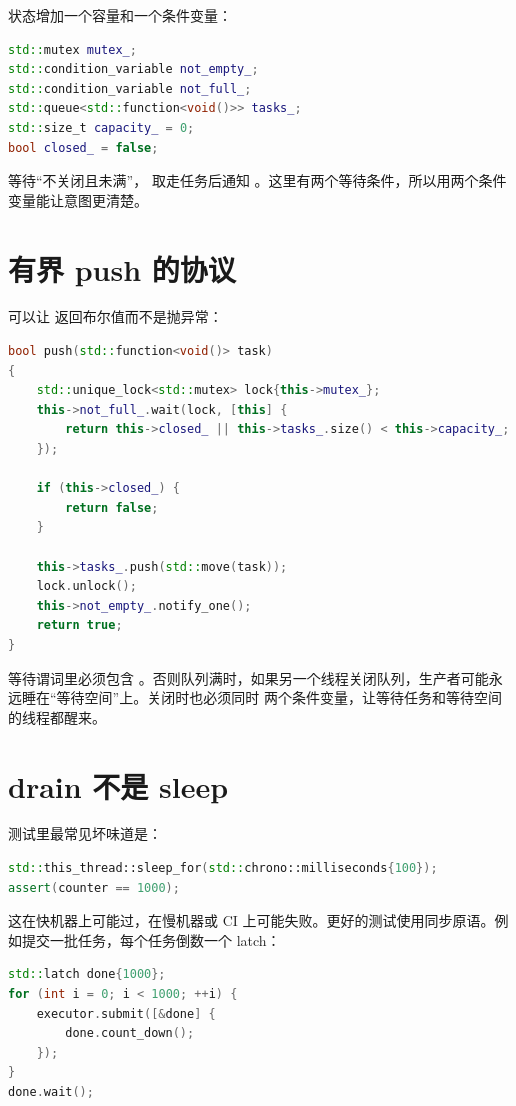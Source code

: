 状态增加一个容量和一个条件变量：

\begin{lstlisting}[language=C++,caption={有界任务队列状态}]
std::mutex mutex_;
std::condition_variable not_empty_;
std::condition_variable not_full_;
std::queue<std::function<void()>> tasks_;
std::size_t capacity_ = 0;
bool closed_ = false;
\end{lstlisting}

 等待“不关闭且未满”， 取走任务后通知 。这里有两个等待条件，所以用两个条件变量能让意图更清楚。

\section{有界 push 的协议}

可以让  返回布尔值而不是抛异常：

\begin{lstlisting}[language=C++,caption={有界队列提交任务}]
bool push(std::function<void()> task)
{
    std::unique_lock<std::mutex> lock{this->mutex_};
    this->not_full_.wait(lock, [this] {
        return this->closed_ || this->tasks_.size() < this->capacity_;
    });

    if (this->closed_) {
        return false;
    }

    this->tasks_.push(std::move(task));
    lock.unlock();
    this->not_empty_.notify_one();
    return true;
}
\end{lstlisting}

等待谓词里必须包含 。否则队列满时，如果另一个线程关闭队列，生产者可能永远睡在“等待空间”上。关闭时也必须同时  两个条件变量，让等待任务和等待空间的线程都醒来。

\section{drain 不是 sleep}

测试里最常见坏味道是：

\begin{lstlisting}[language=C++,caption={不要靠睡眠等待任务完成}]
std::this_thread::sleep_for(std::chrono::milliseconds{100});
assert(counter == 1000);
\end{lstlisting}

这在快机器上可能过，在慢机器或 CI 上可能失败。更好的测试使用同步原语。例如提交一批任务，每个任务倒数一个 latch：

\begin{lstlisting}[language=C++,caption={用 latch 等待任务完成}]
std::latch done{1000};
for (int i = 0; i < 1000; ++i) {
    executor.submit([&done] {
        done.count_down();
    });
}
done.wait();
\end{lstlisting}

